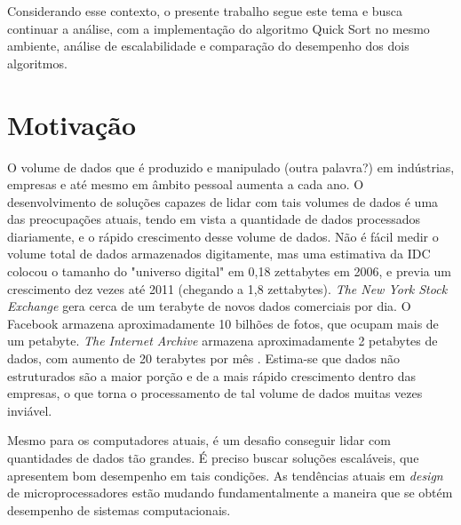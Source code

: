 Considerando esse contexto, o presente trabalho segue este tema e busca continuar a análise, com a implementação do algoritmo Quick Sort no mesmo ambiente, análise de escalabilidade e comparação do desempenho dos dois algoritmos.




\section{Motivação}


O volume de dados que é produzido e manipulado (outra palavra?) em indústrias, empresas e até mesmo em âmbito pessoal aumenta a cada ano. O desenvolvimento de soluções capazes de lidar com tais volumes de dados é uma das preocupações atuais, tendo em vista a quantidade de dados processados diariamente, e o rápido crescimento desse volume de dados.
Não é fácil medir o volume total de dados armazenados digitamente, mas uma estimativa da IDC \cite{Gantz:2008} colocou o tamanho do "universo digital" em 0,18 zettabytes em 2006, e previa um crescimento dez vezes até 2011 (chegando a 1,8 zettabytes).
 \textit{The New York Stock Exchange} gera cerca de um terabyte de novos dados comerciais por dia. O Facebook armazena aproximadamente 10 bilhões de fotos, que ocupam mais de um petabyte. \textit{The Internet Archive} armazena aproximadamente 2 petabytes de dados, com aumento de 20 terabytes por mês
\cite{Hadoop:2010}. Estima-se que dados não estruturados são a maior porção e de a mais rápido crescimento dentro das empresas, o que torna o processamento de tal volume de dados muitas vezes inviável.

Mesmo para os computadores atuais, é um desafio conseguir lidar com quantidades de dados tão grandes. É preciso buscar soluções escaláveis, que apresentem bom desempenho em tais condições. As tendências atuais em \textit{design} de microprocessadores estão mudando fundamentalmente a maneira que se obtém desempenho de sistemas computacionais. 

